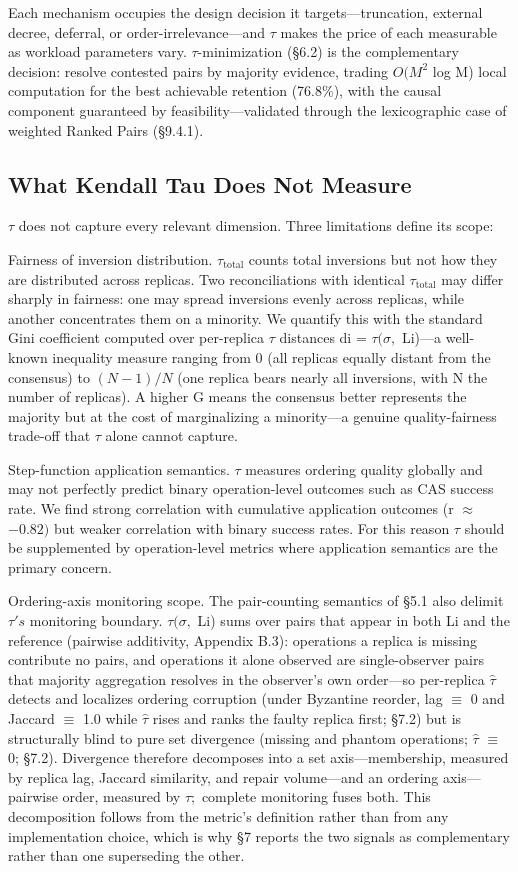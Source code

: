 \documentclass[journal]{IEEEtran}
\begin{document}
Each mechanism occupies the design decision it targets—truncation, external decree, deferral, or order-irrelevance—and $\tau$ makes the price of each measurable as workload parameters vary. $\tau$-minimization (§6.2) is the complementary decision: resolve contested pairs by majority evidence, trading $O(M^{2}$ log M) local computation for the best achievable retention (76.8\%), with the causal component guaranteed by feasibility—validated through the lexicographic case of weighted Ranked Pairs (§9.4.1).

\subsection{What Kendall Tau Does Not Measure}
$\tau$ does not capture every relevant dimension. Three limitations define its scope:

Fairness of inversion distribution. $\tau_{\mathrm{total}}$ counts total inversions but not how they are distributed across replicas. Two reconciliations with identical $\tau_{\mathrm{total}}$ may differ sharply in fairness: one may spread inversions evenly across replicas, while another concentrates them on a minority. We quantify this with the standard Gini coefficient computed over per-replica $\tau$ distances di = $\tau(\sigma,$ Li)—a well-known inequality measure ranging from 0 (all replicas equally distant from the consensus) to $(N-1)/N$ (one replica bears nearly all inversions, with N the number of replicas). A higher G means the consensus better represents the majority but at the cost of marginalizing a minority—a genuine quality-fairness trade-off that $\tau$ alone cannot capture.

Step-function application semantics. $\tau$ measures ordering quality globally and may not perfectly predict binary operation-level outcomes such as CAS success rate. We find strong correlation with cumulative application outcomes (r $\approx$ $-0.82)$ but weaker correlation with binary success rates. For this reason $\tau$ should be supplemented by operation-level metrics where application semantics are the primary concern.

Ordering-axis monitoring scope. The pair-counting semantics of §5.1 also delimit $\tau's$ monitoring boundary. $\tau(\sigma,$ Li) sums over pairs that appear in both Li and the reference (pairwise additivity, Appendix B.3): operations a replica is missing contribute no pairs, and operations it alone observed are single-observer pairs that majority aggregation resolves in the observer's own order—so per-replica $\hat{\tau}$ detects and localizes ordering corruption (under Byzantine reorder, lag $\equiv$ 0 and Jaccard $\equiv$ 1.0 while $\hat{\tau}$ rises and ranks the faulty replica first; §7.2) but is structurally blind to pure set divergence (missing and phantom operations; $\hat{\tau}$ $\equiv$ 0; §7.2). Divergence therefore decomposes into a set axis—membership, measured by replica lag, Jaccard similarity, and repair volume—and an ordering axis—pairwise order, measured by $\tau;$ complete monitoring fuses both. This decomposition follows from the metric's definition rather than from any implementation choice, which is why §7 reports the two signals as complementary rather than one superseding the other.
\end{document}
